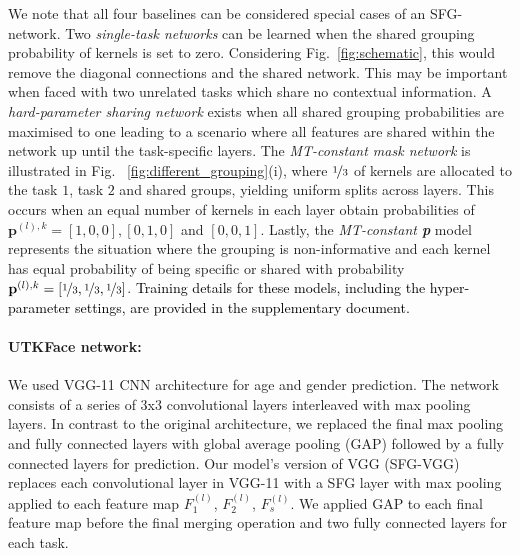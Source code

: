 We note that all four baselines can be considered special cases of an SFG-network. Two \emph{single-task networks} can be learned when the shared grouping probability of kernels is set to zero. Considering Fig.~\ref{fig:schematic}, this would remove the diagonal connections and the shared network. This may be important when faced with two unrelated tasks which share no contextual information. A \emph{hard-parameter sharing network} exists when all shared grouping probabilities are maximised to one leading to a scenario where all features are shared within the network up until the task-specific layers. The \emph{MT-constant mask network} is illustrated in Fig.~ \ref{fig:different_grouping}(i), where $\nicefrac{1}{3}$ of kernels are allocated to the task $1$, task $2$ and shared groups, yielding uniform splits across layers. This occurs when an equal number of kernels in each layer obtain probabilities of $\mathbf{p}^{(l),k}=[1, 0, 0], [0, 1, 0]$ and $[0, 0, 1]$. Lastly, the \emph{MT-constant \textbf{p}} model represents the situation where the grouping is non-informative and each kernel has equal probability of being specific or shared with probability $\mathbf{p}^{(l),k}=[\nicefrac{1}{3}, \nicefrac{1}{3}, \nicefrac{1}{3}]$. \textcolor{black}{Training details for these models, including the hyper-parameter settings, are provided in the supplementary document.}

    \paragraph{UTKFace network:} We used VGG-11 CNN architecture \cite{vgg} for age and gender prediction. The network consists of a series of $3$x$3$ convolutional layers interleaved with max pooling layers. In contrast to the original architecture, we replaced the final max pooling and fully connected layers with global average pooling (GAP) followed by a fully connected layers for prediction. Our model's version of VGG (SFG-VGG) replaces each convolutional layer in VGG-11 with a SFG layer with max pooling applied to each feature map $F^{(l)}_{1}$, $F^{(l)}_{2}$, $F^{(l)}_{s}$. We applied GAP to each final feature map before the final merging operation and two fully connected layers for each task.
    
